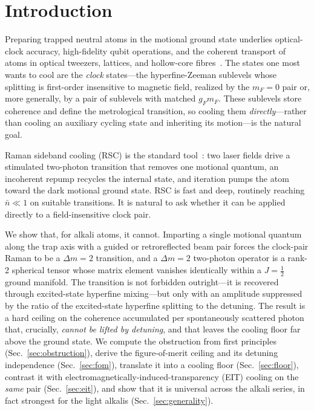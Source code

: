 \documentclass[aps,pra,reprint,amsmath,amssymb,superscriptaddress,floatfix]{revtex4-2}
\newcommand{\nbar}{\bar n}
\newcommand{\Dm}{\Delta m}
\begin{document}
\section{Introduction}
Preparing trapped neutral atoms in the motional ground state underlies optical-clock accuracy,
high-fidelity qubit operations, and the coherent transport of atoms in optical tweezers, lattices,
and hollow-core fibres~\cite{eschner2003,leong2020}. The states one most wants to cool are the
\emph{clock} states---the hyperfine-Zeeman sublevels whose splitting is first-order insensitive to
magnetic field, realized by the $m_F=0$ pair or, more generally, by a pair of sublevels with
matched $g_F m_F$. These sublevels store coherence and define the metrological transition, so
cooling them \emph{directly}---rather than cooling an auxiliary cycling state and inheriting its
motion---is the natural goal.

Raman sideband cooling (RSC) is the standard tool~\cite{winelanditano1979,eschner2003}: two laser
fields drive a stimulated two-photon transition that removes one motional quantum, an incoherent
repump recycles the internal state, and iteration pumps the atom toward the dark motional ground
state. RSC is fast and deep, routinely reaching $\nbar\ll1$ on suitable transitions. It is natural
to ask whether it can be applied directly to a field-insensitive clock pair.

We show that, for alkali atoms, it cannot. Imparting a single motional quantum along the trap axis
with a guided or retroreflected beam pair forces the clock-pair Raman to be a $\Dm=2$ transition,
and a $\Dm=2$ two-photon operator is a rank-2 spherical tensor whose matrix element vanishes
identically within a $J=\tfrac12$ ground manifold. The transition is not forbidden outright---it is
recovered through excited-state hyperfine mixing---but only with an amplitude suppressed by the
ratio of the excited-state hyperfine splitting to the detuning. The result is a hard ceiling on the
coherence accumulated per spontaneously scattered photon that, crucially, \emph{cannot be lifted by
detuning}, and that leaves the cooling floor far above the ground state. We compute the obstruction
from first principles (Sec.~\ref{sec:obstruction}), derive the figure-of-merit ceiling and its
detuning independence (Sec.~\ref{sec:fom}), translate it into a cooling floor
(Sec.~\ref{sec:floor}), contrast it with electromagnetically-induced-transparency (EIT) cooling on
the \emph{same} pair (Sec.~\ref{sec:eit}), and show that it is universal across the alkali series,
in fact strongest for the light alkalis (Sec.~\ref{sec:generality}).
\end{document}
